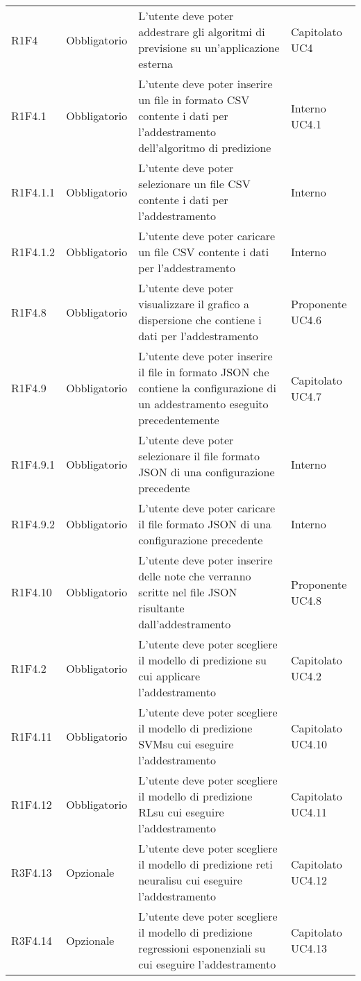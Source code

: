 \begin{longtable} {
		>{}p{24mm} 
		>{}p{32mm}
		>{}p{40mm} 
		>{}p{24.5mm}
		}
		R1F4 & Obbligatorio & L'utente deve poter addestrare gli algoritmi di previsione su un'applicazione esterna & Capitolato UC4 \TBstrut \\ [2mm]		
		R1F4.1 & Obbligatorio & L'utente deve poter inserire un file in formato CSV contente i dati per l'addestramento dell'algoritmo di predizione & Interno UC4.1 \TBstrut \\ [2mm]		
		R1F4.1.1 & Obbligatorio & L'utente deve poter selezionare un file CSV contente i dati per l'addestramento & Interno \TBstrut \\ [2mm]
		R1F4.1.2 & Obbligatorio & L'utente deve poter caricare un file CSV contente i dati per l'addestramento & Interno \TBstrut \\ [2mm]
		R1F4.8 & Obbligatorio & L'utente deve poter visualizzare il grafico a dispersione che contiene i dati per l'addestramento & Proponente UC4.6 \TBstrut \\ [2mm]
		R1F4.9 & Obbligatorio & L'utente deve poter inserire il file in formato JSON che contiene la configurazione di un addestramento eseguito precedentemente & Capitolato UC4.7 \TBstrut \\ [2mm]
		R1F4.9.1 & Obbligatorio & L'utente deve poter selezionare il file formato JSON di una configurazione precedente & Interno \TBstrut \\ [2mm]
		R1F4.9.2 & Obbligatorio & L'utente deve poter caricare il file formato JSON di una configurazione precedente & Interno \TBstrut \\ [2mm]
		R1F4.10 & Obbligatorio & L'utente deve poter inserire delle note che verranno scritte nel file JSON risultante dall'addestramento & Proponente UC4.8 \TBstrut \\ [2mm]	
		R1F4.2 & Obbligatorio & L'utente deve poter scegliere il modello di predizione su cui applicare l'addestramento & Capitolato UC4.2 \TBstrut \\ [2mm]
		R1F4.11 & Obbligatorio & L'utente deve poter scegliere il modello di predizione SVM\glosp su cui eseguire l'addestramento & Capitolato UC4.10 \TBstrut \\ [2mm]
		R1F4.12 & Obbligatorio & L'utente deve poter scegliere il modello di predizione RL\glosp su cui eseguire l'addestramento & Capitolato UC4.11 \TBstrut \\ [2mm]
		R3F4.13 & Opzionale & L'utente deve poter scegliere il modello di predizione reti neurali\glosp su cui eseguire l'addestramento & Capitolato UC4.12 \TBstrut \\
		R3F4.14 & Opzionale & L'utente deve poter scegliere il modello di predizione regressioni esponenziali su cui eseguire l'addestramento & Capitolato UC4.13 \TBstrut \\

\end{longtable}
